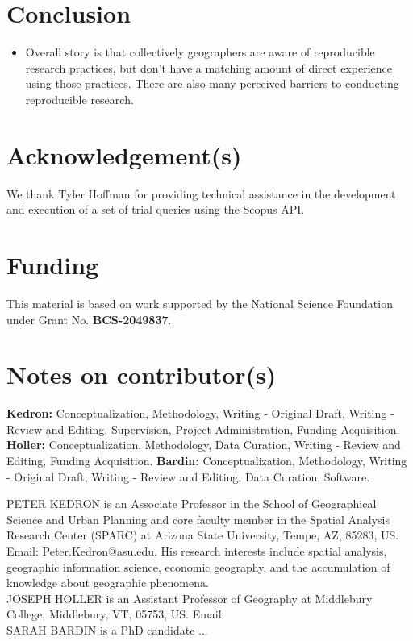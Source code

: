 \documentclass[]{interact}
\theoremstyle{plain}%
\theoremstyle{definition}
\theoremstyle{remark}
\begin{document}
\section*{Conclusion}

\begin{itemize}
    \item Overall story is that collectively geographers are aware of reproducible research practices, but don't have a matching amount of direct experience using those practices. There are also many perceived barriers to conducting reproducible research.
\end{itemize}

\theendnotes


\section*{Acknowledgement(s)}
We thank Tyler Hoffman for providing technical assistance in the development and execution of a set of trial queries using the Scopus API.

\section*{Funding}
This material is based on work supported by the National Science Foundation under Grant No. \textbf{BCS-2049837}.

\section*{Notes on contributor(s)}
\textbf{Kedron:} Conceptualization, Methodology, Writing - Original Draft, Writing - Review and Editing, Supervision, Project Administration, Funding Acquisition. \textbf{Holler:} Conceptualization, Methodology, Data Curation, Writing - Review and Editing, Funding Acquisition. \textbf{Bardin:} Conceptualization, Methodology, Writing - Original Draft, Writing - Review and Editing, Data Curation, Software.



\newpage


\newpage
\noindent PETER KEDRON is an Associate Professor in the School of Geographical Science and Urban Planning and core faculty member in the Spatial Analysis Research Center (SPARC) at Arizona State University, Tempe, AZ, 85283, US. Email: Peter.Kedron@asu.edu. His research interests include spatial analysis, geographic information science, economic geography, and the accumulation of knowledge about geographic phenomena. \\  
  
\noindent JOSEPH HOLLER is an Assistant Professor of Geography at Middlebury College, Middlebury, VT, 05753, US. Email: \\
  
\noindent SARAH BARDIN is a PhD candidate ...
\end{document}
